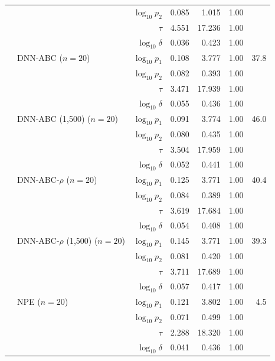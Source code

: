 \begin{tabular}{llrrrrr}
 &  & $\log_{10}p_2$ & 0.085 & 1.015 & 1.00 &  \\
 &  & $\tau$ & 4.551 & 17.236 & 1.00 &  \\
 &  & $\log_{10}\delta$ & 0.036 & 0.423 & 1.00 &  \\
 & DNN-ABC ($n=20$) & $\log_{10}p_1$ & 0.108 & 3.777 & 1.00 & 37.8 \\
 &  & $\log_{10}p_2$ & 0.082 & 0.393 & 1.00 &  \\
 &  & $\tau$ & 3.471 & 17.939 & 1.00 &  \\
 &  & $\log_{10}\delta$ & 0.055 & 0.436 & 1.00 &  \\
 & DNN-ABC (1,500) ($n=20$) & $\log_{10}p_1$ & 0.091 & 3.774 & 1.00 & 46.0 \\
 &  & $\log_{10}p_2$ & 0.080 & 0.435 & 1.00 &  \\
 &  & $\tau$ & 3.504 & 17.959 & 1.00 &  \\
 &  & $\log_{10}\delta$ & 0.052 & 0.441 & 1.00 &  \\
 & DNN-ABC-$\rho$ ($n=20$) & $\log_{10}p_1$ & 0.125 & 3.771 & 1.00 & 40.4 \\
 &  & $\log_{10}p_2$ & 0.084 & 0.389 & 1.00 &  \\
 &  & $\tau$ & 3.619 & 17.684 & 1.00 &  \\
 &  & $\log_{10}\delta$ & 0.054 & 0.408 & 1.00 &  \\
 & DNN-ABC-$\rho$ (1,500) ($n=20$) & $\log_{10}p_1$ & 0.145 & 3.771 & 1.00 & 39.3 \\
 &  & $\log_{10}p_2$ & 0.081 & 0.420 & 1.00 &  \\
 &  & $\tau$ & 3.711 & 17.689 & 1.00 &  \\
 &  & $\log_{10}\delta$ & 0.057 & 0.417 & 1.00 &  \\
 & NPE ($n=20$) & $\log_{10}p_1$ & 0.121 & 3.802 & 1.00 & 4.5 \\
 &  & $\log_{10}p_2$ & 0.071 & 0.499 & 1.00 &  \\
 &  & $\tau$ & 2.288 & 18.320 & 1.00 &  \\
 &  & $\log_{10}\delta$ & 0.041 & 0.436 & 1.00 &  \\
\bottomrule
\end{tabular}
